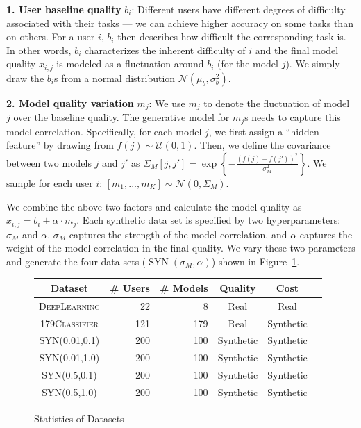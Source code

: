 \documentclass[letterpaper]{vldb}
\DeclareMathOperator{\SYN}{SYN}
\begin{document}
\noindent
{\bf 1. User baseline quality} $b_i$: Different 
users have different degrees of difficulty associated with their tasks --- we can achieve higher accuracy on some tasks than on others.
For a user $i$, $b_i$ then describes how difficult the corresponding task is.
In other words, $b_i$ characterizes the inherent difficulty of $i$ and the final model quality $x_{i,j}$ is modeled as a fluctuation around $b_i$ (for the model $j$). We simply draw the $b_i$s from a normal distribution $\mathcal{N}(\mu_b,\sigma_b^2)$.


\noindent
{\bf 2. Model quality variation} $m_j$: 
We use $m_j$ to denote the fluctuation of model $j$
over the baseline quality. The generative model for 
$m_j$s needs to capture this model correlation.
Specifically, for each model $j$, we first assign a 
``hidden feature'' by drawing
from $f(j)\sim\mathcal{U}(0,1)$.
Then, we define the covariance between 
two models $j$ and $j'$ as 
$\Sigma_M[j, j']=\exp \left\{-\frac{(f(j) - f(j'))^2}{\sigma_M^2} \right\}$. We sample
for each user $i$: $
[m_1,...,m_K] \sim \mathcal{N}(0, \Sigma_M)$.

We combine the above two factors and 
calculate the model quality as $x_{i,j} = b_i + \alpha\cdot m_j$. Each synthetic data
set is specified by two hyperparameters:
$\sigma_M$ and $\alpha$. $\sigma_M$ captures
the strength of the model correlation, and $\alpha$
captures the weight of the model correlation in
the final quality. We vary these two
parameters and generate the four data sets
($\SYN(\sigma_M, \alpha)$) shown in Figure~\ref{tab:datasets}.


\begin{figure}
\centering
\small
\begin{tabular}{c | r r | c c c}
\hline
{\bf Dataset} & {\bf \# Users} & {\bf \# Models} & {\bf Quality} & {\bf Cost} \\
\hline
\textsc{DeepLearning} & 22 & 8 & Real & Real \\
\textsc{179Classifier} & 121 & 179 & Real & Synthetic \\
\hline
\textsc{SYN(0.01,0.1)} & 200 & 100 & Synthetic & Synthetic \\
\textsc{SYN(0.01,1.0)} & 200 & 100 & Synthetic & Synthetic \\
\textsc{SYN(0.5,0.1)} & 200 & 100 & Synthetic & Synthetic \\
\textsc{SYN(0.5,1.0)} & 200 & 100 & Synthetic & Synthetic \\
\hline
\end{tabular}
\vspace{-1em}
\caption{Statistics of Datasets}
\label{tab:datasets}
\vspace{-1em}
\end{figure}
\end{document}
